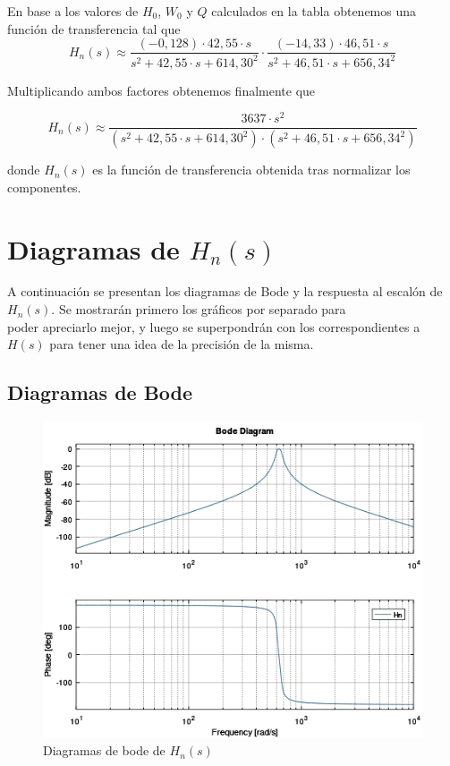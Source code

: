 \documentclass[11pt,a4paper]{report}
\begin{document}
\newpage
En base a los valores de $H_{0}$, $W_{0}$ y $Q$ calculados en la tabla obtenemos una función de transferencia tal que
\[H_{n}(s) \approx \frac{(-0,128) \cdot 42,55 \cdot s}{s^2 + 42,55 \cdot s + 614,30^2} \cdot \frac{(-14,33) \cdot 46,51 \cdot s}{s^2 + 46,51 \cdot s + 656,34^2}\]

Multiplicando ambos factores obtenemos finalmente que

\[H_{n}(s) \approx \frac{3637 \cdot s^2}{(s^2 + 42,55 \cdot s + 614,30^2)
\cdot (s^2 + 46,51 \cdot s + 656,34^2)}\]

donde $H_{n}(s)$ es la función de transferencia obtenida tras normalizar los componentes.

\section*{Diagramas de $H_{n}(s)$}

A continuación se presentan los diagramas de Bode y la respuesta al escalón de $H_{n}(s)$. Se mostrarán primero los gráficos por separado para \\poder apreciarlo mejor, y luego se superpondrán con los correspondientes a $H(s)$ para tener una idea de la precisión de la misma.

\subsection*{Diagramas de Bode}

\begin{figure}[h!]
\centering
\includegraphics[scale=0.7]{DiagramasBodeN.png}
\caption{Diagramas de bode de $H_{n}(s)$}
\end{figure}
\clearpage
\end{document}
